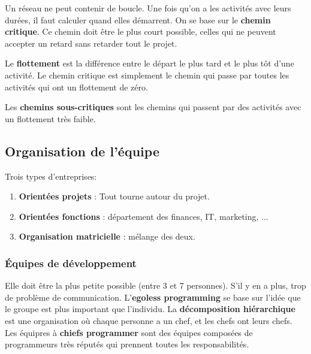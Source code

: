 Un réseau ne peut contenir de boucle.
Une fois qu’on a les activités avec leurs durées, il faut calculer quand elles démarrent.
On se base sur le \textbf{chemin critique}. Ce chemin doit être le plus court possible, celles qui ne peuvent accepter un retard sans retarder tout le projet.

Le \textbf{flottement} est la différence entre le départ le plus tard et le plus tôt d’une activité. Le chemin critique est simplement le chemin qui passe par toutes les activités qui ont un flottement de zéro.

Les \textbf{chemins sous-critiques} sont les chemins qui passent par des activités avec un flottement très faible.



\subsection{Organisation de l’équipe}
Trois types d’entreprises:
\begin{enumerate}
	\item \textbf{Orientées projets} : Tout tourne autour du projet.
	\item \textbf{Orientées fonctions} : département des finances, IT, marketing, ...
	\item \textbf{Organisation matricielle} : mélange des deux.
\end{enumerate}



\subsubsection{Équipes de développement}
Elle doit être la plus petite possible (entre 3 et 7 personnes). S’il y en a plus, trop de problème de communication.
L’\textbf{egoless programming} se base sur l’idée que le groupe est plus important que l’individu.
La \textbf{décomposition hiérarchique} est une organisation où chaque personne a un chef, et les chefs ont leurs chefs.
Les équipres à \textbf{chiefs programmer} sont des équipes composées de programmeurs très réputés qui prennent toutes les responsabilités.